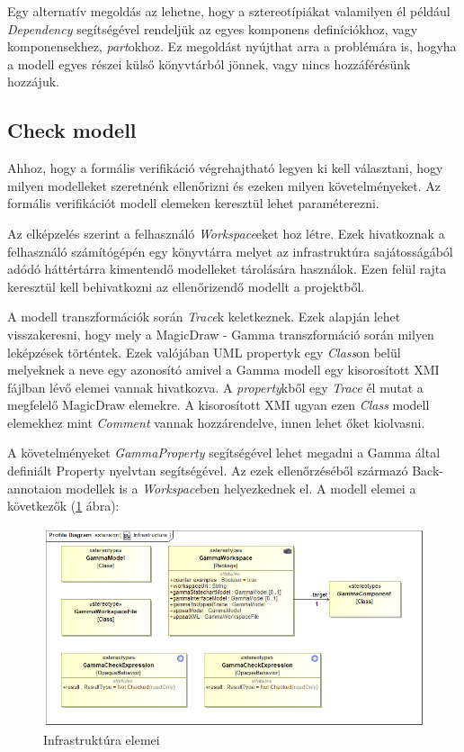 Egy alternatív megoldás az lehetne, hogy a sztereotípiákat valamilyen él például \emph{Dependency} segítségével rendeljük az egyes komponens definíciókhoz, vagy komponensekhez, \emph{part}okhoz. Ez megoldást nyújthat arra a problémára is, hogyha a modell egyes részei külső könyvtárból jönnek, vagy nincs hozzáférésünk hozzájuk.


\subsection{Check modell}

Ahhoz, hogy a formális verifikáció végrehajtható legyen ki kell választani, hogy milyen modelleket szeretnénk ellenőrizni és ezeken milyen követelményeket. Az formális verifikációt modell elemeken keresztül lehet paraméterezni.

Az elképzelés szerint a felhasználó \emph{Workspace}eket hoz létre. Ezek hivatkoznak a felhasználó számítógépén egy könyvtárra melyet az infrastruktúra sajátosságából adódó háttértárra kimentendő modelleket tárolására használok. Ezen felül rajta keresztül kell behivatkozni az ellenőrizendő modellt a projektből.

A modell transzformációk során \emph{Trace}k keletkeznek. Ezek alapján lehet visszakeresni, hogy mely a MagicDraw - Gamma transzformáció során milyen leképzések történtek. Ezek valójában UML propertyk egy \emph{Class}on belül melyeknek a neve egy azonosító amivel a Gamma modell egy kisorosított XMI fájlban lévő elemei vannak hivatkozva. A \emph{property}kből egy \emph{Trace} él mutat a megfelelő MagicDraw elemekre. A kisorosított XMI ugyan ezen \emph{Class} modell elemekhez mint \emph{Comment} vannak hozzárendelve, innen lehet őket kiolvasni.

A követelményeket \emph{GammaProperty} segítségével lehet megadni a Gamma által definiált Property nyelvtan segítségével. Az ezek ellenőrzéséből származó Back-annotaion modellek is a \emph{Workspace}ben helyezkednek el. A modell elemei a következők (\ref{fig:Infrastructure} ábra):

\begin{figure}[!ht]
	\centering
	\includegraphics[width=120mm, keepaspectratio]{figures/contribution/Infrastructure.png}
	\caption{Infrastruktúra elemei}
	\label{fig:Infrastructure}
\end{figure}


